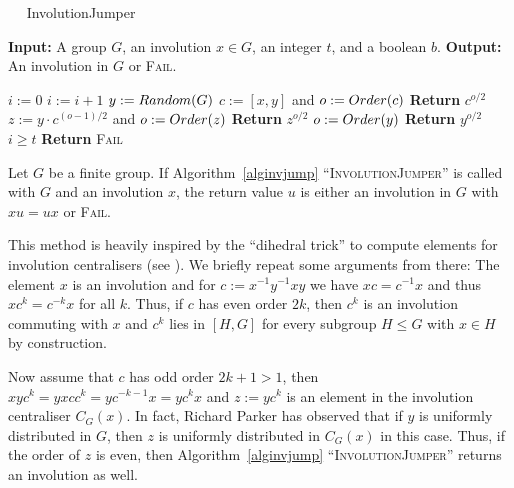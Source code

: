 \begin{algorithm}
\caption{$\quad$ \sc InvolutionJumper}
%
\label{alginvjump}
\begin{algorithmic}
\STATE \textbf{Input:} A group $G$, an involution
$x \in G$, an integer $t$, and a boolean $b$.
\STATE \textbf{Output:} An involution in $G$ or \textsc{Fail}.

\smallskip
\STATE $i := 0$
\REPEAT
    \STATE $i := i + 1$
    \STATE $y := \textsc{Random}(G)$ \hspace*{10mm} 
    \STATE $c := [x,y]$ and
    $o := \textsc{Order}(c)$
            \STATE \textbf{Return} $c^{o/2}$
            \STATE $z := y \cdot c^{(o-1)/2}$ and
            $o := \textsc{Order}(z)$
                \STATE \textbf{Return} $z^{o/2}$
            \ENDIF
        \ENDIF
        \STATE $o := \textsc{Order}(y)$
            \STATE \textbf{Return} $y^{o/2}$
        \ENDIF
    \ENDIF
\UNTIL $i \ge t$
\STATE \textbf{Return} \textsc{Fail}
\end{algorithmic}
\end{algorithm}

\begin{Prop}
Let $G$ be a finite group. If Algorithm~\ref{alginvjump}
``\textsc{InvolutionJumper}'' is called with $G$ and an
involution $x$, the return value $u$ is either an involution in $G$ with
$xu=ux$ or \textsc{Fail}. 
\end{Prop}
\proofbeg
This method is heavily inspired by the ``dihedral trick'' to compute
elements for involution centralisers (see \cite[2.2]{BrayInv}). We briefly
repeat some arguments from there:
The element $x$ is an
involution and for $c := x^{-1} y^{-1} x y$ we have 
$x c = c^{-1}x$ and thus
$xc^k = c^{-k}x$ for all $k$. Thus, if $c$ has even 
order $2k$, then
$c^k$ is an involution commuting with $x$ and $c^k$ lies in $[H,G]$ 
for every subgroup $H \le G$ with $x \in H$ by construction.

Now assume that $c$ has odd order $2k+1 > 1$,
then $xyc^k = yxcc^k = y c^{-k-1}x=yc^kx$ and $z := yc^k$ is an 
element in the 
involution
centraliser $C_{G}(x)$. In fact, Richard Parker has observed that
if $y$ is
uniformly distributed in $G$, then $z$ is uniformly distributed in
$C_{G}(x)$ in this case. Thus, if the order of $z$ is even,
then Algorithm~\ref{alginvjump} ``\textsc{InvolutionJumper}'' 
returns an involution as well.

